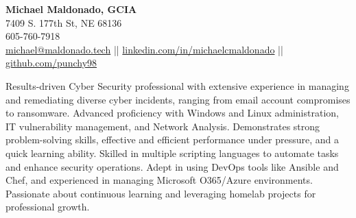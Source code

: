 \documentclass[a4paper,10pt]{article}
\begin{document}
\begin{center}
    \textbf{\LARGE Michael Maldonado, GCIA } \\
    7409 S. 177th St, NE 68136 \\
    605-760-7918 \\
    \href{mailto:michael@maldonado.tech}{michael@maldonado.tech} ||
    \href{https://linkedin.com/in/michaelcmaldonado}{linkedin.com/in/michaelcmaldonado} ||
    \href{https://github.com/punchy98}{github.com/punchy98} 
\end{center}

Results-driven Cyber Security professional with extensive experience in managing and remediating diverse cyber incidents, ranging from email account compromises to ransomware. Advanced proficiency with Windows and Linux administration, IT vulnerability management, and Network Analysis. Demonstrates strong problem-solving skills, effective and efficient performance under pressure, and a quick learning ability. Skilled in multiple scripting languages to automate tasks and enhance security operations. Adept in using DevOps tools like Ansible and Chef, and experienced in managing Microsoft O365/Azure environments. Passionate about continuous learning and leveraging homelab projects for professional growth.
\end{document}
